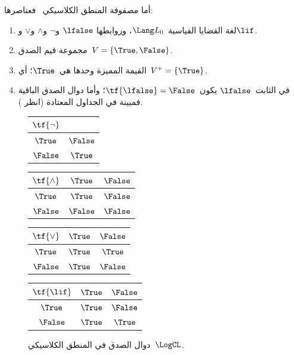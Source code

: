 \documentclass[../../../include/open-logic-section]{subfiles}
\begin{document}
\begin{ex}
أما مصفوفة المنطق الكلاسيكي~\LogCL{} فعناصرها:
\begin{enumerate}
  \item لغة القضايا القياسية~$\Lang L_0$، وروابطها
  $\lfalse$ و$\lnot$ و$\land$ و$\lor$ و$\lif$.
  \item مجموعة قيم الصدق~$V = \{\True, \False\}$.
  \item القيمة المميزة وحدها هي~$\True$؛ أي~$V^+ = \{\True\}$.
  \item في الثابت~$\lfalse$ يكون~$\tf{\lfalse} = \False$؛ وأما
  دوال الصدق الباقية فمبينة في الجداول المعتادة (انظر
  ).
\end{enumerate}
\begin{figure}
  \begin{center}
      \begin{tabular}{c|c}
        $\tf{\lnot}$ & \\
        \hline
        $\True$ & $\False$ \\
        $\False$ & $\True$
      \end{tabular}
      \quad
      \begin{tabular}{c|cc}
        $\tf{\land}$ & $\True$ & $\False$ \\
        \hline
        $\True$ & $\True$ & $\False$ \\
        $\False$ & $\False$ & $\False$
      \end{tabular}
      \quad
      \begin{tabular}{c|cc}
        $\tf{\lor}$ & $\True$ & $\False$ \\
        \hline
        $\True$ & $\True$ & $\True$ \\
        $\False$ & $\True$ & $\False$
      \end{tabular}
      \quad
      \begin{tabular}{c|cc}
        $\tf{\lif}$ & $\True$ & $\False$ \\
        \hline
        $\True$ & $\True$ & $\False$ \\
        $\False$ & $\True$ & $\True$
      \end{tabular}
    \end{center}
    \caption{دوال الصدق في المنطق الكلاسيكي~$\LogCL$.}
  \end{figure}
  \end{ex}
\end{document}
